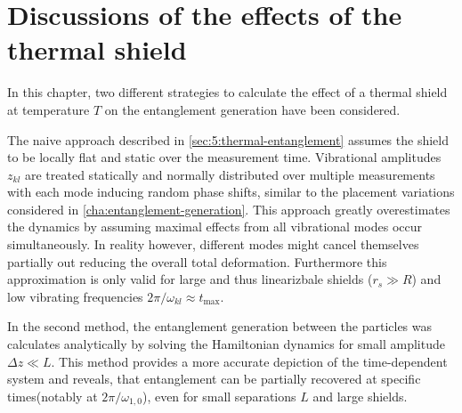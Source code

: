 \section{Discussions of the effects of the thermal shield} \label{sec:5:discussion}

In this chapter, two different strategies to calculate the effect of a thermal shield at temperature $T$ on the entanglement generation have been considered. 

The naive approach described in \cref{sec:5:thermal-entanglement} assumes the shield to be locally flat and static over the measurement time. Vibrational amplitudes $z_{kl}$ are treated statically and normally distributed over multiple measurements with each mode inducing random phase shifts, similar to the placement variations considered in \cref{cha:entanglement-generation}.
This approach greatly overestimates the dynamics by assuming maximal effects from all vibrational modes occur simultaneously. In reality however, different modes might cancel themselves partially out reducing the overall total deformation.
Furthermore this approximation is only valid for large and thus linearizbale shields ($r_s \gg R$) and low vibrating frequencies $2\pi/\omega_{kl} \approx t_\mathrm{max}$.

In the second method, the entanglement generation between the particles was calculates analytically by solving the Hamiltonian dynamics for small amplitude $\Delta z \ll L$. This method provides a more accurate depiction of the time-dependent system and reveals, that entanglement can be partially recovered at specific times(notably at $2\pi/\omega_{1,0}$), even for small separations $L$ and large shields.

